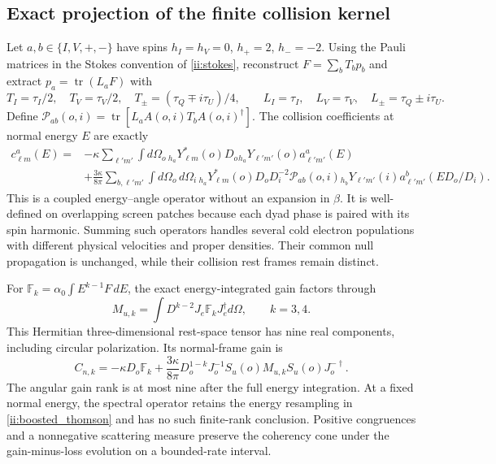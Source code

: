 \subsection{Exact projection of the finite collision kernel}
Let $a,b\in\{I,V,+,-\}$ have spins $h_I=h_V=0$, $h_+=2$, $h_-=-2$. Using the Pauli matrices in the Stokes convention of \eqref{ii:stokes}, reconstruct $F=\sum_bT_bp_b$ and extract $p_a=\operatorname{tr}(L_aF)$ with
\begin{equation}
 T_I=\tau_I/2,\quad T_V=\tau_V/2,\quad
 T_\pm=(\tau_Q\mp i\tau_U)/4,\qquad
 L_I=\tau_I,\quad L_V=\tau_V,\quad L_\pm=\tau_Q\pm i\tau_U.
 \label{ii:stokes_reconstruction}
\end{equation}
Define $\mathcal P_{ab}(o,i)=\operatorname{tr}[L_aA(o,i)T_bA(o,i)^\dagger]$. The collision coefficients at normal energy $E$ are exactly
\begin{align}
 c^a_{\ell m}(E)={}&-\kappa\sum_{\ell'm'}\int d\Omega_o\,
 {}_{h_a}Y_{\ell m}^*(o)D_o{}_{h_a}Y_{\ell'm'}(o)a^a_{\ell'm'}(E)\nonumber\\
 &+\frac{3\kappa}{8\pi}\sum_{b,\ell'm'}\int d\Omega_o\,d\Omega_i\,
 {}_{h_a}Y_{\ell m}^*(o)D_oD_i^{-2}\mathcal P_{ab}(o,i)
 {}_{h_b}Y_{\ell'm'}(i)a^b_{\ell'm'}(ED_o/D_i).
 \label{ii:exact_collision_harmonics}
\end{align}
This is a coupled energy--angle operator without an expansion in $\beta$. It is well-defined on overlapping screen patches because each dyad phase is paired with its spin harmonic. Summing such operators handles several cold electron populations with different physical velocities and proper densities. Their common null propagation is unchanged, while their collision rest frames remain distinct.


For $\mathbb F_k=\alpha_0\int E^{k-1}F\,dE$, the exact energy-integrated gain factors through
\begin{equation}
 M_{u,k}=\int D^{k-2}J_e\mathbb F_kJ_e^\dagger d\Omega,
 \qquad k=3,4.
 \label{ii:thomson_carrier}
\end{equation}
This Hermitian three-dimensional rest-space tensor has nine real components, including circular polarization. Its normal-frame gain is
\begin{equation}
 C_{n,k}=-\kappa D_o\mathbb F_k
 +\frac{3\kappa}{8\pi}D_o^{1-k}
 J_o^{-1}S_u(o)M_{u,k}S_u(o)J_o^{-\dagger}.
 \label{ii:weighted_thomson}
\end{equation}
The angular gain rank is at most nine after the full energy integration. At a fixed normal energy, the spectral operator retains the energy resampling in \eqref{ii:boosted_thomson} and has no such finite-rank conclusion. Positive congruences and a nonnegative scattering measure preserve the coherency cone under the gain-minus-loss evolution on a bounded-rate interval.


